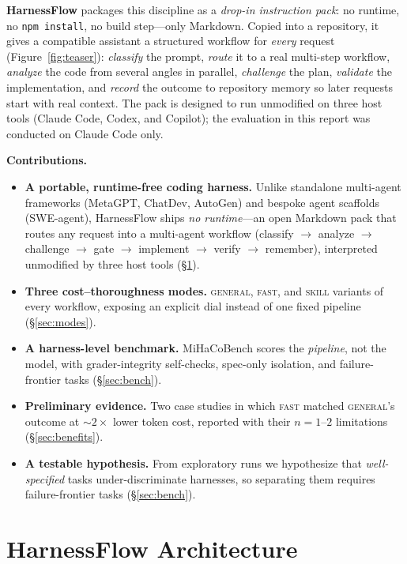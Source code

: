 \documentclass{article}
\begin{document}
\textbf{HarnessFlow} packages this discipline as a \emph{drop-in instruction
pack}: no runtime, no \texttt{npm install}, no build step---only Markdown. Copied
into a repository, it gives a compatible assistant a structured workflow for
\emph{every} request (Figure~\ref{fig:teaser}): \emph{classify} the prompt,
\emph{route} it to a real multi-step workflow, \emph{analyze} the code from
several angles in parallel, \emph{challenge} the plan, \emph{validate} the
implementation, and \emph{record} the outcome to repository memory so later
requests start with real context. The pack is designed to run unmodified on three
host tools (Claude Code, Codex, and Copilot); the evaluation in this report was
conducted on Claude Code only.

\noindent\textbf{Contributions.}
\begin{itemize}\setlength{\itemsep}{1.5pt}\setlength{\parskip}{0pt}\itemsep1.5pt
\item \textbf{A portable, runtime-free coding harness.} Unlike standalone
multi-agent frameworks (MetaGPT, ChatDev, AutoGen) and bespoke agent scaffolds
(SWE-agent), HarnessFlow ships \emph{no runtime}---an open Markdown pack that
routes any request into a multi-agent workflow (classify $\to$ analyze $\to$
challenge $\to$ gate $\to$ implement $\to$ verify $\to$ remember), interpreted
unmodified by three host tools (\S\ref{sec:arch}).
\item \textbf{Three cost--thoroughness modes.} \textsc{general}, \textsc{fast},
and \textsc{skill} variants of every workflow, exposing an explicit dial instead
of one fixed pipeline (\S\ref{sec:modes}).
\item \textbf{A harness-level benchmark.} MiHaCoBench scores the \emph{pipeline},
not the model, with grader-integrity self-checks, spec-only isolation, and
failure-frontier tasks (\S\ref{sec:bench}).
\item \textbf{Preliminary evidence.} Two case studies in which \textsc{fast}
matched \textsc{general}'s outcome at ${\sim}2\times$ lower token cost, reported
with their $n{=}1$--$2$ limitations (\S\ref{sec:benefits}).
\item \textbf{A testable hypothesis.} From exploratory runs we hypothesize that
\emph{well-specified} tasks under-discriminate harnesses, so separating them
requires failure-frontier tasks (\S\ref{sec:bench}).
\end{itemize}

\section{HarnessFlow Architecture}
\label{sec:arch}
\end{document}
